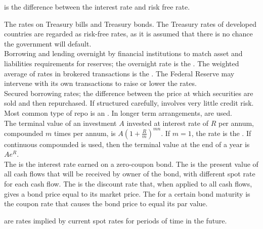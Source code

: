 {

\begin{definition}  is the difference between the interest rate and risk free rate.
\end{definition}

 The rates on Treasury bills and Treasury bonds. The Treasury rates of developed countries are regarded as risk-free rates, as it is assumed that there is no chance the government will default.\\

 Borrowing and lending overnight by financial institutions to match asset and liabilities requirements for reserves; the overnight rate is the . The weighted average of rates in brokered transactions is the . The Federal Reserve may intervene with its own transactions to raise or lower the rates.\\

 Secured borrowing rates; the difference between the price at which securities are sold and then repurchased. If structured carefully, involves very little credit risk. Most common type of repo is an . In longer term arrangements,  are used.\\

The terminal value of an investment $A$ invested at interest rate of $R$ per annum, compounded $m$ times per annum, is $A(1+\frac{R}{m})^{mn}$. If $m=1$, the rate is the . If continuous compounded is used, then  the terminal value at the end of a year is $Ae^{R}$.\\

The  is the interest rate earned on a zero-coupon bond. The  is the present value of all cash flows that will be received by owner of the bond, with different spot rate for each cash flow. The  is the discount rate that, when applied to all cash flows, gives a bond price equal to its market price. The  for a certain bond maturity is the coupon rate that causes the bond price to equal its par value.\\

\begin{definition}
 are rates implied by current spot rates for periods of time in the future.
\end{definition}

}

